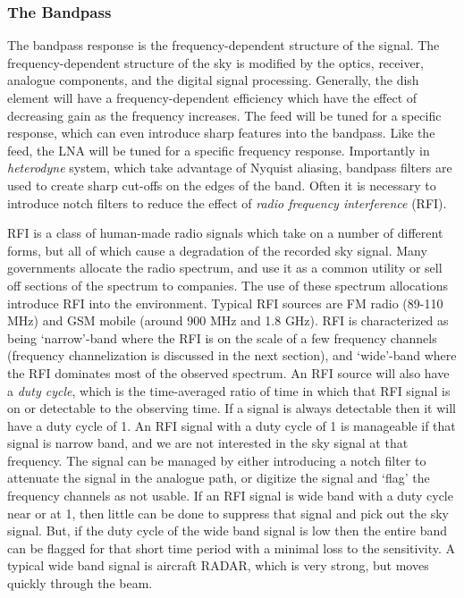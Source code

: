 \documentclass[usenatbib,usegraphicx]{article}
\begin{document}
\subsubsection{The Bandpass}

The bandpass response is the frequency-dependent structure of the signal.
The frequency-dependent structure of the sky is modified by the optics, receiver, analogue components, and the digital signal processing.
Generally, the dish element will have a frequency-dependent efficiency which have the effect of decreasing gain as the frequency increases.
The feed will be tuned for a specific response, which can even introduce sharp features into the bandpass.
Like the feed, the LNA will be tuned for a specific frequency response.
Importantly in \emph{heterodyne} system, which take advantage of Nyquist aliasing, bandpass filters are used to create sharp cut-offs on the edges of the band.
Often it is necessary to introduce notch filters to reduce the effect of \emph{radio frequency interference} (RFI).

RFI is a class of human-made radio signals which take on a number of different forms, but all of which cause a degradation of the recorded sky signal.
Many governments allocate the radio spectrum, and use it as a common utility or sell off sections of the spectrum to companies.
The use of these spectrum allocations introduce RFI into the environment.
Typical RFI sources are FM radio (89-110 MHz) and GSM mobile (around 900 MHz and 1.8 GHz).
RFI is characterized as being `narrow'-band where the RFI is on the scale of a few frequency channels (frequency channelization is discussed in the next section), and `wide'-band where the RFI dominates most of the observed spectrum.
An RFI source will also have a \emph{duty cycle}, which is the time-averaged ratio of time in which that RFI signal is on or detectable to the observing time.
If a signal is always detectable then it will have a duty cycle of 1.
An RFI signal with a duty cycle of 1 is manageable if that signal is narrow band, and we are not interested in the sky signal at that frequency.
The signal can be managed by either introducing a notch filter to attenuate the signal in the analogue path, or digitize the signal and `flag' the frequency channels as not usable.
If an RFI signal is wide band with a duty cycle near or at 1, then little can be done to suppress that signal and pick out the sky signal.
But, if the duty cycle of the wide band signal is low then the entire band can be flagged for that short time period with a minimal loss to the sensitivity.
A typical wide band signal is aircraft RADAR, which is very strong, but moves quickly through the beam.
\end{document}
